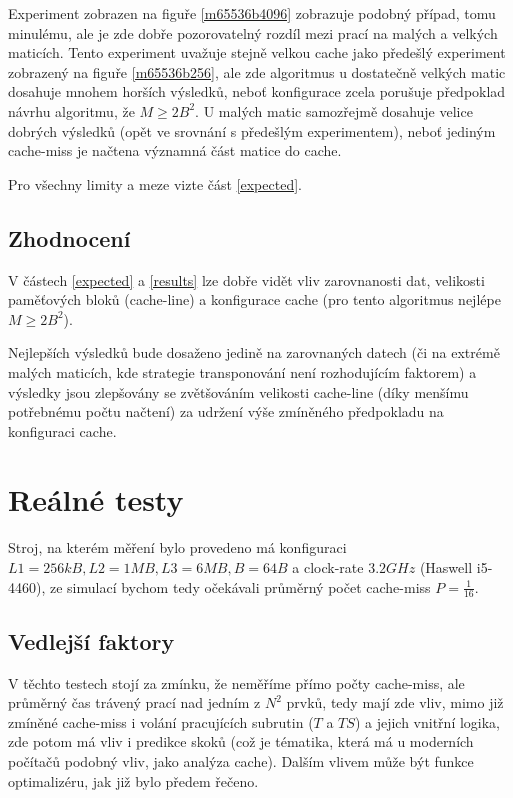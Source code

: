 \documentclass[a4paper,12pt]{article} %
\begin{document}
Experiment zobrazen na figuře \ref{m65536b4096} zobrazuje podobný případ, tomu minulému, ale je zde dobře pozorovatelný rozdíl mezi prací na malých a velkých maticích. Tento experiment uvažuje stejně velkou cache jako předešlý experiment zobrazený na figuře \ref{m65536b256}, ale zde algoritmus u dostatečně velkých matic dosahuje mnohem horších výsledků, neboť konfigurace zcela porušuje předpoklad návrhu algoritmu, že $M \geq 2 B^2$. U malých matic samozřejmě dosahuje velice dobrých výsledků (opět ve srovnání s předešlým experimentem), neboť jediným cache-miss je načtena významná část matice do cache.

Pro všechny limity a meze vizte část \ref{expected}.

\subsection{Zhodnocení}

V částech \ref{expected} a \ref{results} lze dobře vidět vliv zarovnanosti dat, velikosti paměťových bloků (cache-line) a konfigurace cache (pro tento algoritmus nejlépe $M \geq 2 B^2$).

Nejlepších výsledků bude dosaženo jedině na zarovnaných datech (či na extrémě malých maticích, kde strategie transponování není rozhodujícím faktorem) a výsledky jsou zlepšovány se zvětšováním velikosti cache-line (díky menšímu potřebnému počtu načtení) za udržení výše zmíněného předpokladu na konfiguraci cache.

\pagebreak

\section{Reálné testy}

Stroj, na kterém měření bylo provedeno má konfiguraci $L1 = 256 kB, L2 = 1 MB, L3 = 6 MB, B = 64B$ a clock-rate $3.2 GHz$ (Haswell i5-4460), ze simulací bychom tedy očekávali průměrný počet cache-miss $P = \frac{1}{16}$.

\subsection{Vedlejší faktory}

V těchto testech stojí za zmínku, že neměříme přímo počty cache-miss, ale průměrný čas trávený prací nad jedním z $N^2$ prvků, tedy mají zde vliv, mimo již zmíněné cache-miss i volání pracujících subrutin ($T$ a $TS$) a jejich vnitřní logika, zde potom má vliv i predikce skoků (což je tématika, která má u moderních počítačů podobný vliv, jako analýza cache). Dalším vlivem může být funkce optimalizéru, jak již bylo předem řečeno.
\end{document}
